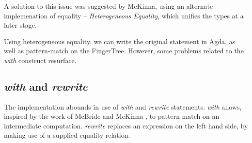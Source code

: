 \documentclass[12pt,twoside,notitlepage]{report}
\begin{document}
\begin{code}
\\
\> \AgdaSymbol{:}  \AgdaSymbol{\{}\AgdaSymbol{\}\{} \AgdaSymbol{:}  \AgdaSymbol{\}} \AgdaSymbol{\{} \AgdaSymbol{:}   \AgdaSymbol{\}}\<%
\\
\>[2]\<[14]%
\>[14]  \AgdaSymbol{:}   \<%
\\
\>[2]\<[14]%
\>[14]  \AgdaSymbol{:}    \<%
\\
\>[2]\<[14]%
\>[14] \AgdaSymbol{(} \AgdaSymbol{:}   \AgdaSymbol{)}\<%
\\
\>[2]\<[14]%
\>[14] \AgdaSymbol{(}   \AgdaSymbol{)}\<%
\\
\>[2]\<[14]%
\>[14] \AgdaSymbol{(}  \AgdaSymbol{)}\<%
\\
\>   \AgdaSymbol{=} \<%
\\
\> \AgdaSymbol{(} \AgdaSymbol{)} \AgdaSymbol{()}\<%
\\
\> \AgdaSymbol{(}    \AgdaSymbol{)} \AgdaSymbol{()}\<%
\\
\end{code}

A solution to this issue was suggested by McKinna\cite{hetero}, using an alternate implemenation of equality -- \textit{Heterogeneous Equality}, which unifies the types at a later stage.

Using heterogeneous equality, we can write the original statement in Agda, as well as pattern-match on the FingerTree. However, some problems related to the \textit{with} construct resurface.

\subsection{\textit{with} and \textit{rewrite}}
\label{sec:with}
The implementation abounds in use of \textit{with} and \textit{rewrite} statements. \textit{with} allows, inspired by the work of McBride and McKinna \cite{viewleft}, to pattern match on an intermediate computation. \textit{rewrite} replaces an expression on the left hand side, by making use of a supplied equality relation.
\end{document}
